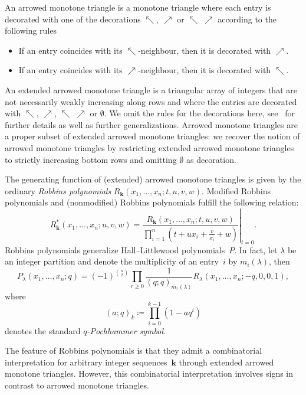 \documentclass[ALCO, Unicode]{cedram}
\newcommand{\nenwarrow}{\nwarrow \!\!\!\!\!\;\!\! \nearrow}
\newcommand{\deff}[1]{\emph{#1}}
\newcommand{\boldk}{\boldsymbol{k}}
\begin{document}
	An arrowed monotone triangle is a monotone triangle where each entry is decorated with one of the decorations $\nwarrow$, $\nearrow$ or $\nenwarrow$ according to the following rules
	\begin{itemize}
		\item If an entry coincides with its $\nwarrow$-neighbour, then it is decorated with $\nearrow$.
		\item If an entry coincides with its $\nearrow$-neighbour, then it is decorated with $\nwarrow$.
	\end{itemize}
	An extended arrowed monotone triangle is a triangular array of integers that are not necessarily weakly increasing along rows and where the entries are decorated with $\nwarrow$, $\nearrow$, $\nenwarrow$ or $\emptyset$. We omit the rules for the decorations here, see~\cite{FS23} for further details as well as further generalizations. Arrowed monotone triangles are a proper subset of extended arrowed monotone triangles: we recover the notion of arrowed monotone triangles by restricting extended arrowed monotone triangles to strictly increasing bottom rows and omitting $\emptyset$ as decoration.
	
	The generating function of (extended) arrowed monotone triangles is given by the ordinary \deff{Robbins polynomials} $R_{\boldk} (x_{1},\ldots,x_{n};t,u,v,w)$. Modified Robbins polynomials and (nonmodified) Robbins polynomials fulfill the following relation:
	\begin{equation*}
		R_{\boldk}^{\ast}(x_{1},\ldots,x_{n};u,v,w) = \left. \frac{R_{\boldk}(x_{1},\ldots,x_{n};t,u,v,w)}{\prod_{i=1}^{n} \left(t+u x_i + \frac{v}{x_i}   + w \right)}\right|_{t=0}.
	\end{equation*}
	Robbins polynomials generalize Hall--Littlewood polynomials~$P$. In fact, let $\lambda$ be an integer partition and denote the multiplicity of an entry~$i$ by $m_i(\lambda)$, then
	\begin{equation*}
		P_{\lambda}(x_1,\dots,x_n;q) = (-1)^{\binom{n}{2}} \prod_{r \ge 0}  \frac{1}{(q;q)_{m_r(\lambda)}} R_{\lambda}(x_{1},\ldots,x_{n};-q,0,0,1),
	\end{equation*} 
	where
	\begin{equation*}
		(a;q)_k \coloneqq \prod_{i=0}^{k-1} (1-a q^i)
	\end{equation*}
	denotes the standard \deff{$q$-Pochhammer symbol}.
	
	The feature of Robbins polynomials is that they admit a combinatorial interpretation for arbitrary integer sequences~$\boldk$ through extended arrowed monotone triangles. However, this combinatorial interpretation involves signs in contrast to arrowed monotone triangles.	
	
\end{document}
